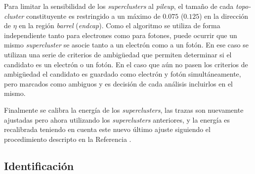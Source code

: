 Para limitar la sensibilidad de los \textit{superclusters} al \textit{pileup}, el tamaño de cada \textit{topo-cluster} constituyente es restringido a un máximo de $0.075$ ($0.125$) en la dirección de $\eta$  en la región \textit{barrel} (\textit{endcap}). Como el algoritmo se utiliza de forma independiente tanto para electrones como para fotones, puede ocurrir que un mismo \textit{supercluster} se asocie tanto a un electrón como a un fotón. En ese caso se utilizan una serie de criterios de ambigüedad que permiten determinar si el candidato es un electrón o un fotón. En el caso que aún no pasen los criterios de ambigüedad el candidato es guardado como electrón y fotón simultáneamente, pero marcados como ambiguos y es decisión de cada análisis incluirlos en el mismo.

Finalmente se calibra la energía de los \textit{superclusters}, las trazas son nuevamente ajustadas pero ahora utilizando los \textit{superclusters} anteriores, y la energía es recalibrada teniendo en cuenta este nuevo último ajuste siguiendo el procedimiento descripto en la Referencia \cite{PERF-2017-03}.


\subsection{Identificación}

